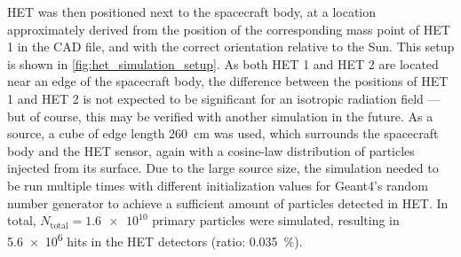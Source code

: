 \ac{HET} was then positioned next to the spacecraft body, at a location approximately derived from the position of the corresponding mass point of \ac{HET} 1 in the \ac{CAD} file, and with the correct orientation relative to the Sun. This setup is shown in \autoref{fig:het_simulation_setup}. As both \ac{HET} 1 and \ac{HET} 2 are located near an edge of the spacecraft body, the difference between the positions of \ac{HET} 1 and \ac{HET} 2 is not expected to be significant for an isotropic radiation field --- but of course, this may be verified with another simulation in the future. As a source, a cube of edge length \SI{260}{\centi\meter} was used, which surrounds the spacecraft body and the \ac{HET} sensor, again with a cosine-law distribution of particles injected from its surface. Due to the large source size, the simulation needed to be run multiple times with different initialization values for \ac{Geant4}'s random number generator to achieve a sufficient amount of particles detected in \ac{HET}. In total, $N_\text{total} = \num{1.6e10}$ primary particles were simulated, resulting in \num{5.6e6} hits in the \ac{HET} detectors (ratio: \SI{0.035}{\percent}).

